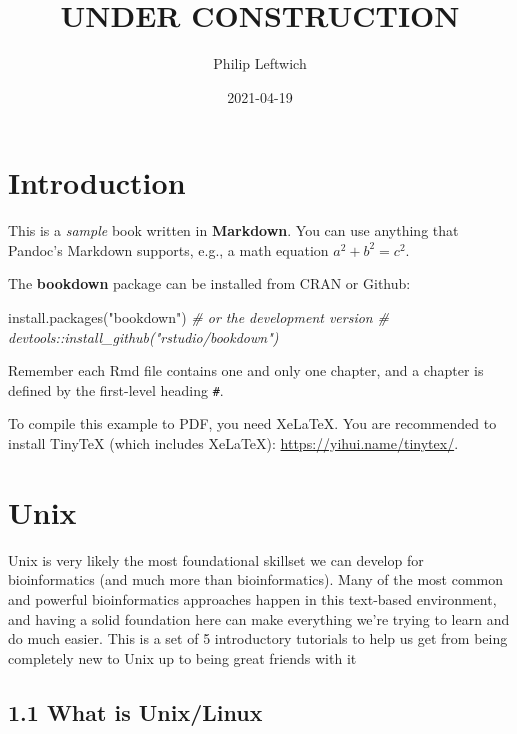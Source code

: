 \documentclass[
]{book}
\title{UNDER CONSTRUCTION}
\author{Philip Leftwich}
\date{2021-04-19}
\newenvironment{Shaded}{\begin{snugshade}}{\end{snugshade}}
\newcommand{\CommentTok}[1]{\textcolor[rgb]{0.56,0.35,0.01}{\textit{#1}}}
\newcommand{\FunctionTok}[1]{\textcolor[rgb]{0.00,0.00,0.00}{#1}}
\newcommand{\NormalTok}[1]{#1}
\newcommand{\StringTok}[1]{\textcolor[rgb]{0.31,0.60,0.02}{#1}}
\begin{document}
\maketitle

{
\setcounter{tocdepth}{1}
\tableofcontents
}
\hypertarget{introduction}{%
\chapter{Introduction}\label{introduction}}

This is a \emph{sample} book written in \textbf{Markdown}. You can use anything that Pandoc's Markdown supports, e.g., a math equation \(a^2 + b^2 = c^2\).

The \textbf{bookdown} package can be installed from CRAN or Github:

\begin{Shaded}
\begin{Highlighting}[]
\FunctionTok{install.packages}\NormalTok{(}\StringTok{"bookdown"}\NormalTok{)}
\CommentTok{\# or the development version}
\CommentTok{\# devtools::install\_github("rstudio/bookdown")}
\end{Highlighting}
\end{Shaded}

Remember each Rmd file contains one and only one chapter, and a chapter is defined by the first-level heading \texttt{\#}.

To compile this example to PDF, you need XeLaTeX. You are recommended to install TinyTeX (which includes XeLaTeX): \url{https://yihui.name/tinytex/}.

\hypertarget{Unix}{%
\chapter{Unix}\label{Unix}}

Unix is very likely the most foundational skillset we can develop for bioinformatics (and much more than bioinformatics). Many of the most common and powerful bioinformatics approaches happen in this text-based environment, and having a solid foundation here can make everything we're trying to learn and do much easier. This is a set of 5 introductory tutorials to help us get from being completely new to Unix up to being great friends with it 🙂

\hypertarget{what-is-unixlinux}{%
\section{1.1 What is Unix/Linux}\label{what-is-unixlinux}}
\end{document}
